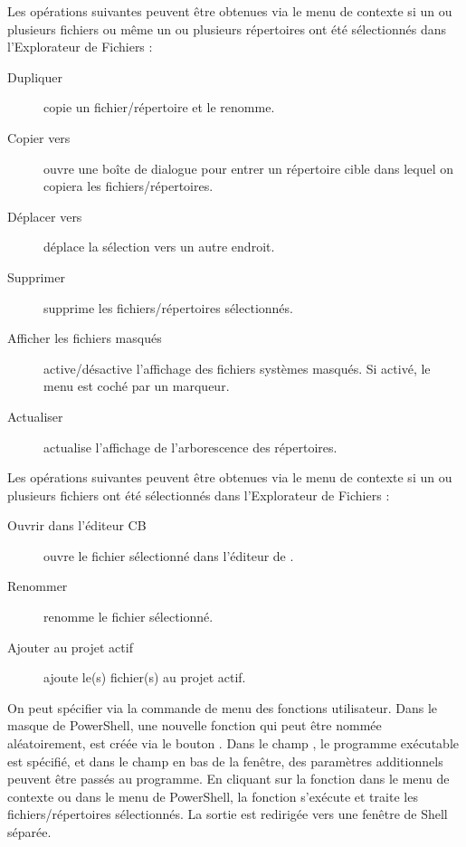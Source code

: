 Les opérations suivantes peuvent être obtenues via le menu de contexte si un ou plusieurs fichiers ou même un ou plusieurs répertoires ont été sélectionnés dans l'Explorateur de Fichiers :

\begin{description}
\item[Dupliquer] copie un fichier/répertoire et le renomme.
\item[Copier vers] ouvre une boîte de dialogue pour entrer un répertoire cible dans lequel on copiera les fichiers/répertoires.
\item[Déplacer vers] déplace la sélection vers un autre endroit.
\item[Supprimer] supprime les fichiers/répertoires sélectionnés.
\item[Afficher les fichiers masqués] active/désactive l'affichage des fichiers systèmes masqués. Si activé, le menu est coché par un marqueur.
\item[Actualiser] actualise l'affichage de l'arborescence des répertoires.
\end{description}

Les opérations suivantes peuvent être obtenues via le menu de contexte si un ou plusieurs fichiers ont été sélectionnés dans l'Explorateur de Fichiers :

\begin{description}
\item[Ouvrir dans l'éditeur CB] ouvre le fichier sélectionné dans l'éditeur de \codeblocks.
\item[Renommer] renomme le fichier sélectionné.
\item[Ajouter au projet actif] ajoute le(s) fichier(s) au projet actif.
\end{description}


On peut spécifier via la commande de menu  des fonctions utilisateur. Dans le masque de PowerShell, une nouvelle fonction qui peut être nommée aléatoirement, est créée via le bouton . Dans le champ , le programme exécutable est spécifié, et dans le champ en bas de la fenêtre, des paramètres additionnels peuvent être passés au programme.
En cliquant sur la fonction dans le menu de contexte ou dans le menu de PowerShell, la fonction s'exécute et traite les fichiers/répertoires sélectionnés. La sortie est redirigée vers une fenêtre de Shell séparée.

